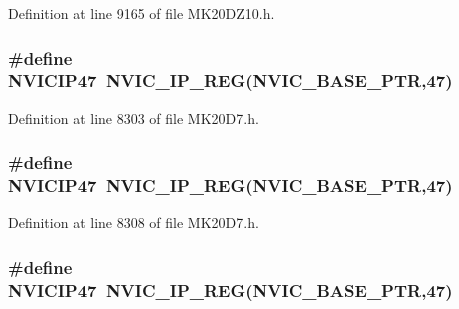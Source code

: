 Definition at line 9165 of file M\+K20\+D\+Z10.\+h.

\subsubsection[{\texorpdfstring{N\+V\+I\+C\+I\+P47}{NVICIP47}}]{\setlength{\rightskip}{0pt plus 5cm}\#define N\+V\+I\+C\+I\+P47~{\bf N\+V\+I\+C\+\_\+\+I\+P\+\_\+\+R\+EG}({\bf N\+V\+I\+C\+\_\+\+B\+A\+S\+E\+\_\+\+P\+TR},47)}\hypertarget{group___n_v_i_c___register___accessor___macros_ga47f783cff474dd2cce5985b52eb2f503}{}\label{group___n_v_i_c___register___accessor___macros_ga47f783cff474dd2cce5985b52eb2f503}


Definition at line 8303 of file M\+K20\+D7.\+h.

\subsubsection[{\texorpdfstring{N\+V\+I\+C\+I\+P47}{NVICIP47}}]{\setlength{\rightskip}{0pt plus 5cm}\#define N\+V\+I\+C\+I\+P47~{\bf N\+V\+I\+C\+\_\+\+I\+P\+\_\+\+R\+EG}({\bf N\+V\+I\+C\+\_\+\+B\+A\+S\+E\+\_\+\+P\+TR},47)}\hypertarget{group___n_v_i_c___register___accessor___macros_ga47f783cff474dd2cce5985b52eb2f503}{}\label{group___n_v_i_c___register___accessor___macros_ga47f783cff474dd2cce5985b52eb2f503}


Definition at line 8308 of file M\+K20\+D7.\+h.

\subsubsection[{\texorpdfstring{N\+V\+I\+C\+I\+P47}{NVICIP47}}]{\setlength{\rightskip}{0pt plus 5cm}\#define N\+V\+I\+C\+I\+P47~{\bf N\+V\+I\+C\+\_\+\+I\+P\+\_\+\+R\+EG}({\bf N\+V\+I\+C\+\_\+\+B\+A\+S\+E\+\_\+\+P\+TR},47)}\hypertarget{group___n_v_i_c___register___accessor___macros_ga47f783cff474dd2cce5985b52eb2f503}{}\label{group___n_v_i_c___register___accessor___macros_ga47f783cff474dd2cce5985b52eb2f503}


